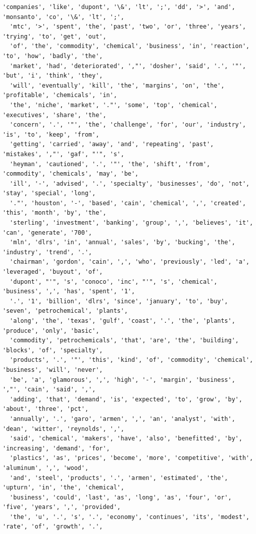 \documentclass[11pt]{article}
\begin{document}
\begin{Verbatim}[commandchars=\\\{\}]
  'companies', 'like', 'dupont', '\&', 'lt', ';', 'dd', '>', 'and', 'monsanto', 'co', '\&', 'lt', ';',
  'mtc', '>', 'spent', 'the', 'past', 'two', 'or', 'three', 'years', 'trying', 'to', 'get', 'out',
  'of', 'the', 'commodity', 'chemical', 'business', 'in', 'reaction', 'to', 'how', 'badly', 'the',
  'market', 'had', 'deteriorated', ',"', 'dosher', 'said', '.', '"', 'but', 'i', 'think', 'they',
  'will', 'eventually', 'kill', 'the', 'margins', 'on', 'the', 'profitable', 'chemicals', 'in',
  'the', 'niche', 'market', '."', 'some', 'top', 'chemical', 'executives', 'share', 'the',
  'concern', '.', '"', 'the', 'challenge', 'for', 'our', 'industry', 'is', 'to', 'keep', 'from',
  'getting', 'carried', 'away', 'and', 'repeating', 'past', 'mistakes', ',"', 'gaf', "'", 's',
  'heyman', 'cautioned', '.', '"', 'the', 'shift', 'from', 'commodity', 'chemicals', 'may', 'be',
  'ill', '-', 'advised', '.', 'specialty', 'businesses', 'do', 'not', 'stay', 'special', 'long',
  '."', 'houston', '-', 'based', 'cain', 'chemical', ',', 'created', 'this', 'month', 'by', 'the',
  'sterling', 'investment', 'banking', 'group', ',', 'believes', 'it', 'can', 'generate', '700',
  'mln', 'dlrs', 'in', 'annual', 'sales', 'by', 'bucking', 'the', 'industry', 'trend', '.',
  'chairman', 'gordon', 'cain', ',', 'who', 'previously', 'led', 'a', 'leveraged', 'buyout', 'of',
  'dupont', "'", 's', 'conoco', 'inc', "'", 's', 'chemical', 'business', ',', 'has', 'spent', '1',
  '.', '1', 'billion', 'dlrs', 'since', 'january', 'to', 'buy', 'seven', 'petrochemical', 'plants',
  'along', 'the', 'texas', 'gulf', 'coast', '.', 'the', 'plants', 'produce', 'only', 'basic',
  'commodity', 'petrochemicals', 'that', 'are', 'the', 'building', 'blocks', 'of', 'specialty',
  'products', '.', '"', 'this', 'kind', 'of', 'commodity', 'chemical', 'business', 'will', 'never',
  'be', 'a', 'glamorous', ',', 'high', '-', 'margin', 'business', ',"', 'cain', 'said', ',',
  'adding', 'that', 'demand', 'is', 'expected', 'to', 'grow', 'by', 'about', 'three', 'pct',
  'annually', '.', 'garo', 'armen', ',', 'an', 'analyst', 'with', 'dean', 'witter', 'reynolds', ',',
  'said', 'chemical', 'makers', 'have', 'also', 'benefitted', 'by', 'increasing', 'demand', 'for',
  'plastics', 'as', 'prices', 'become', 'more', 'competitive', 'with', 'aluminum', ',', 'wood',
  'and', 'steel', 'products', '.', 'armen', 'estimated', 'the', 'upturn', 'in', 'the', 'chemical',
  'business', 'could', 'last', 'as', 'long', 'as', 'four', 'or', 'five', 'years', ',', 'provided',
  'the', 'u', '.', 's', '.', 'economy', 'continues', 'its', 'modest', 'rate', 'of', 'growth', '.',

\end{Verbatim}
\end{document}
